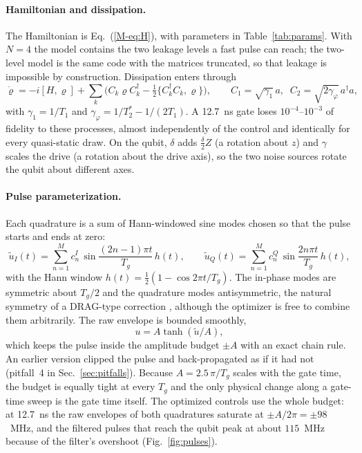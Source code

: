 \documentclass[aps,pra,onecolumn,notitlepage,superscriptaddress,nofootinbib,floatfix]{revtex4-2}
\begin{document}
\paragraph*{Hamiltonian and dissipation.} The Hamiltonian is Eq.~(\ref{M-eq:H}),
with parameters in Table~\ref{tab:params}. With $N=4$ the model contains
the two leakage levels a fast pulse can reach; the two-level model is the
same code with the matrices truncated, so that leakage is impossible by
construction. Dissipation enters through
\begin{equation}
\dot\varrho=-i[H,\varrho]+\sum_k\Big(C_k\varrho C_k^\dagger-\tfrac12\{C_k^\dagger C_k,\varrho\}\Big),
\qquad C_1=\sqrt{\gamma_1}\,a,\;\; C_2=\sqrt{2\gamma_\varphi}\,a^\dagger a,
\label{eq:lindblad}
\end{equation}
with $\gamma_1=1/T_1$ and $\gamma_\varphi=1/T_2^*-1/(2T_1)$. A 12.7~ns gate
loses $10^{-4}$--$10^{-3}$ of fidelity to these processes, almost
independently of the control and identically for every quasi-static draw.
On the qubit, $\delta$ adds $\tfrac\delta2Z$ (a rotation about $z$) and
$\gamma$ scales the drive (a rotation about the drive axis), so the two noise
sources rotate the qubit about different axes.

\paragraph*{Pulse parameterization.} Each quadrature is a sum of Hann-windowed
sine modes chosen so that the pulse starts and ends at zero:
\begin{equation}
\tilde u_I(t)=\sum_{n=1}^{M}c^{I}_n\,\sin\!\frac{(2n-1)\pi t}{T_g}\,h(t),\qquad
\tilde u_Q(t)=\sum_{n=1}^{M}c^{Q}_n\,\sin\!\frac{2n\pi t}{T_g}\,h(t),
\label{eq:basis}
\end{equation}
with the Hann window $h(t)=\tfrac12(1-\cos 2\pi t/T_g)$. The in-phase modes
are symmetric about $T_g/2$ and the quadrature modes antisymmetric, the
natural symmetry of a DRAG-type correction \cite{Motzoi2009}, although the
optimizer is free to combine them arbitrarily. The raw envelope is bounded
smoothly,
\begin{equation}
u=A\tanh(\tilde u/A),
\label{eq:tanh}
\end{equation}
which keeps the pulse inside the amplitude budget $\pm A$ with an exact chain
rule. An earlier version clipped the pulse and back-propagated as if it had
not (pitfall~4 in Sec.~\ref{sec:pitfalls}). Because
$A=2.5\,\pi/T_g$ scales with the gate time, the budget is equally tight at
every $T_g$ and the only physical change along a gate-time sweep is the gate
time itself. The optimized controls use the whole budget: at 12.7~ns the raw
envelopes of both quadratures saturate at $\pm A/2\pi=\pm98$~MHz, and the
filtered pulses that reach the qubit peak at about $115$~MHz because of the
filter's overshoot (Fig.~\ref{fig:pulses}).
\end{document}
